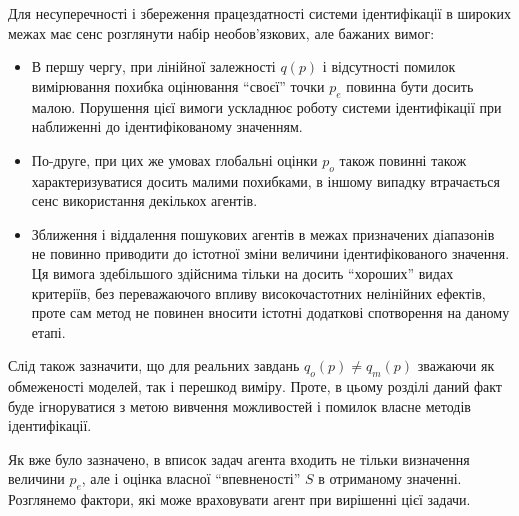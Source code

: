 Для несуперечності і збереження працездатності системи
ідентифікації в широких межах має сенс розглянути набір
необов'язкових, але бажаних вимог:

\begin{itemize}

  \item
    В першу чергу, при лінійної залежності
    $q(p)$ і відсутності помилок вимірювання похибка оцінювання
    ``своєї'' точки
    $p_e$ повинна бути досить малою. Порушення цієї вимоги
    ускладнює роботу системи ідентифікації при наближенні до
    ідентифікованому значенням.

  \item
    По-друге, при цих же умовах глобальні оцінки
    $ p_o $ також повинні також характеризуватися досить малими
    похибками, в іншому випадку втрачається сенс використання
    декількох агентів.

  \item
    Зближення і віддалення пошукових агентів в межах призначених
    діапазонів не повинно приводити до істотної зміни величини
    ідентифікованого значення. Ця вимога здебільшого здійснима
    тільки на досить ``хороших'' видах критеріїв, без переважаючого
    впливу високочастотних нелінійних ефектів, проте сам метод не
    повинен вносити істотні додаткові спотворення на даному етапі.

\end{itemize}

Слід також зазначити, що для реальних завдань
$ q_o (p) \ne q_m (p) $ зважаючи як обмеженості моделей, так і перешкод
виміру. Проте, в цьому розділі даний факт буде ігноруватися
з метою вивчення можливостей і помилок власне методів
ідентифікації.




Як вже було зазначено, в вписок задач агента входить не тільки
визначення величини
$ p_e $, але і оцінка власної ``впевненості''
$ S $ в отриманому значенні. Розглянемо фактори, які може враховувати
агент при вирішенні цієї задачи.

